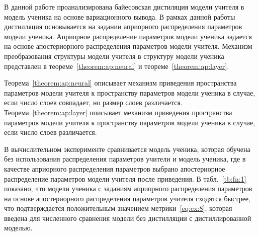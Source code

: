 \documentclass[12pt]{a&t}
\begin{document}
В данной работе проанализирована байесовская дистиляция модели учителя в модель ученика на основе вариационного вывода.
В рамках данной работы дистилляция основывается на задании априорного распределения параметров модели ученика.
Априорное распределение параметров модели ученика задается на основе апостериорного распределения параметров модели учителя.
Механизм преобразования структуры модели учителя в структуру модели ученика представлен в теореме~\ref{theorem:ap:neural} и теореме~\ref{theorem:ap:layer}.

Теорема~\ref{theorem:ap:neural} описывает механизм приведения пространства параметров модели учителя к пространству параметров модели ученика в случае, если число слоев совпадает, но размер слоев различается. Теорема~\ref{theorem:ap:layer} описывает механизм приведения пространства параметров модели учителя к пространству параметров модели ученика в случае, если число слоев различается.

В вычислительном эксперименте сравнивается модель ученика, которая обучена без использования распределения параметров учители и модель ученика, где в качестве априорного распределения параметров выбрано апостериорное распределение параметров модели учителя после приведения. В табл.~\ref{tb:fn:1} показано, что модели ученика с заданиям априорного распределения параметров на основе апостериорного распределения параметров учителя сходятся быстрее, что подтверждается положительным значением метрики~\eqref{eq:ex:8}, которая введена для численного сравнения модели без дистилляции с  дистиллированной моделью.
\end{document}
